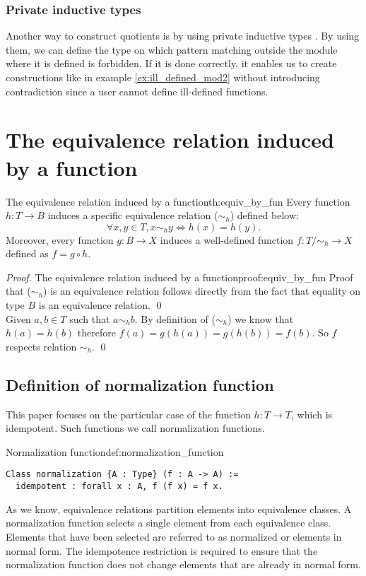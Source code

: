 \subsubsection{Private inductive types}
Another way to construct quotients is by using private inductive types \cite{PrivetInductive}. By using them, we can define the type on which pattern matching outside the module where it is defined is forbidden. If it is done correctly, it enables us to create constructions like in example \ref{ex:ill_defined_mod2} without introducing contradiction since a user cannot define ill-defined functions.

\section{The equivalence relation induced by a function}
\begin{theo}{The equivalence relation induced by a function}{th:equiv_by_fun}
Every function $h: T \rightarrow B$ induces a specific equivalence relation ($\sim_h$) defined below:
$$ \forall x, y \in T, x \sim_h y \iff h(x) = h(y). $$
Moreover, every function $g: B \rightarrow X$ induces a well-defined function $f : T/\sim_h \rightarrow X$ defined as $f = g \circ h$. 
\end{theo}

\begin{proof}{The equivalence relation induced by a function}{proof:equiv_by_fun}
Proof that ($\sim_h$) is an equivalence relation follows directly from the fact that equality on type $B$ is an equivalence relation. \qed \\ 
Given $a, b \in T$ such that $a \sim_h b$. By definition of ($\sim_h$) we know that $h(a) = h(b)$ therefore $f(a) = g(h(a)) = g(h(b)) = f(b)$. So $f$ respects relation $\sim_h$. \qed
\end{proof}
\subsection{Definition of normalization function}
This paper focuses on the particular case of the function $h: T \rightarrow T$, which is idempotent. Such functions we call normalization functions.
\begin{defi}{Normalization function}{def:normalization_function}
\begin{verbatim}
Class normalization {A : Type} (f : A -> A) := 
  idempotent : forall x : A, f (f x) = f x.
\end{verbatim}
\end{defi}
As we know, equivalence relations partition elements into equivalence classes. A normalization function selects a single element from each equivalence class. Elements that have been selected are referred to as normalized or elements in normal form. The idempotence restriction is required to ensure that the normalization function does not change elements that are already in normal form.


